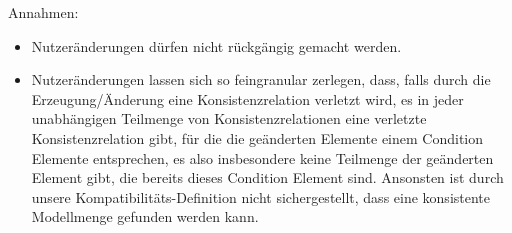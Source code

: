 


Annahmen:
\begin{itemize}
    \item Nutzeränderungen dürfen nicht rückgängig gemacht werden.
    \item Nutzeränderungen lassen sich so feingranular zerlegen, dass, falls durch die Erzeugung/Änderung eine Konsistenzrelation verletzt wird, es in jeder unabhängigen Teilmenge von Konsistenzrelationen eine verletzte Konsistenzrelation gibt, für die die geänderten Elemente einem Condition Elemente entsprechen, es also insbesondere keine Teilmenge der geänderten Element gibt, die bereits dieses Condition Element sind. Ansonsten ist durch unsere Kompatibilitäts-Definition nicht sichergestellt, dass eine konsistente Modellmenge gefunden werden kann.
\end{itemize}







